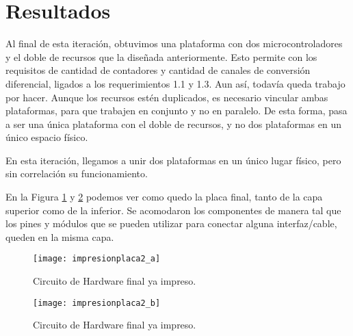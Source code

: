 
\section{Resultados} %
\label{sec:resultados}


Al final de esta iteración, obtuvimos una plataforma con dos microcontroladores y el doble de recursos que la diseñada anteriormente. Esto permite con los requisitos de cantidad de contadores y cantidad de canales de conversión diferencial, ligados a los requerimientos 1.1 y 1.3.
Aun así, todavía queda trabajo por hacer. Aunque los recursos estén duplicados, es necesario vincular ambas plataformas, para que trabajen en conjunto y no en paralelo. De esta forma, pasa a ser una única plataforma con el doble de recursos, y no dos plataformas en un único espacio físico.

En esta iteración, llegamos a unir dos plataformas en un único lugar físico, pero sin correlación su funcionamiento.

En la Figura \ref{fig:impresionplaca2_a} y \ref{fig:impresionplaca2_b} podemos ver como quedo la placa final, tanto de la capa superior como de la inferior. Se acomodaron los componentes de manera tal que los pines y módulos que se pueden utilizar para conectar alguna interfaz/cable, queden en la misma capa.

\begin{figure}  
\centering
  \texttt{[image: impresionplaca2\_a]}
  \caption{Circuito de Hardware final ya impreso.}\label{fig:impresionplaca2_a}
\end{figure}

\begin{figure}  
\centering
  \texttt{[image: impresionplaca2\_b]}
  \caption{Circuito de Hardware final ya impreso.}\label{fig:impresionplaca2_b}
\end{figure}




